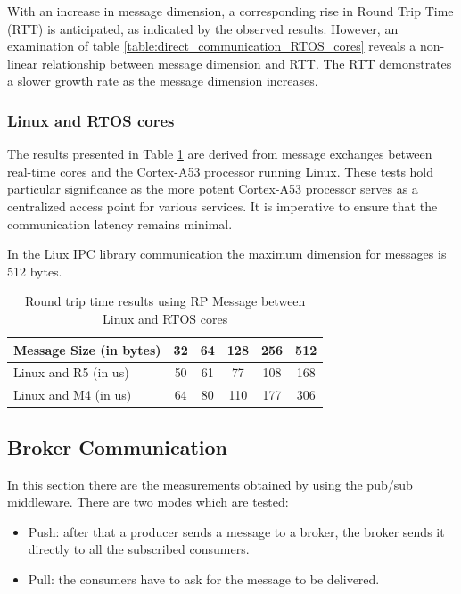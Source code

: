With an increase in message dimension, a corresponding rise in Round Trip Time
(RTT) is anticipated, as indicated by the observed results. However, an
examination of table \ref{table:direct_communication_RTOS_cores} reveals a
non-linear relationship between message dimension and RTT.
The RTT demonstrates a slower growth rate as the message dimension increases.

\subsubsection{Linux and RTOS cores}

The results presented in Table \ref{table:direct_communication_linux_RTOS_cores}
are derived from message exchanges between real-time cores and the Cortex-A53
processor running Linux.
These tests hold particular significance as the more potent Cortex-A53 processor
serves as a centralized access point for various services.
It is imperative to ensure that the communication latency remains minimal.

In the Liux IPC library communication the maximum dimension for messages is
512 bytes.

\begin{table}[H]
\centering
\caption{Round trip time results using RP Message between Linux and RTOS cores}
\label{table:direct_communication_linux_RTOS_cores}
\begin{tabular}{lccccc}
\toprule
Message Size (in bytes) & 32 & 64 & 128 & 256 & 512 \\
\midrule
Linux and R5 (in us) & 50 & 61 & 77 & 108 & 168 \\
Linux and M4 (in us) & 64 & 80 & 110 & 177 & 306 \\
\bottomrule
\end{tabular}
\end{table}

\subsection{Broker Communication}

In this section there are the measurements obtained by using the pub/sub
middleware. There are two modes which are tested:

\begin{itemize}
    \item   Push: after that a producer sends a message to a broker, the broker
            sends it directly to all the subscribed consumers.
    \item   Pull: the consumers have to ask for the message to be delivered.
\end{itemize}

